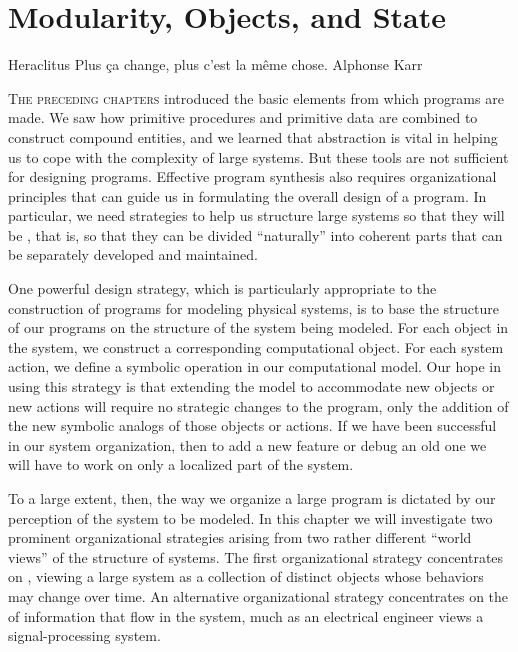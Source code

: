\chapter{Modularity, Objects, and State}
\label{Chapter 3}

%
  {Heraclitus}%
  {}{}%
  {%
    Plus \c{c}a change, plus c'est la m\^{e}me chose.
  }%
  {Alphonse Karr}%
  {}{}%


\noindent
\lettrine{T}{he preceding chapters} introduced the basic elements from which programs are
made.  We saw how primitive procedures and primitive data are combined to
construct compound entities, and we learned that abstraction is vital in
helping us to cope with the complexity of large systems.  But these tools are
not sufficient for designing programs.  Effective program synthesis also
requires organizational principles that can guide us in formulating the overall
design of a program.  In particular, we need strategies to help us structure
large systems so that they will be , that is, so that they can
be divided ``naturally'' into coherent parts that can be separately developed
and maintained.

One powerful design strategy, which is particularly appropriate to the
construction of programs for modeling physical systems, is to base the
structure of our programs on the structure of the system being modeled.  For
each object in the system, we construct a corresponding computational object.
For each system action, we define a symbolic operation in our computational
model.  Our hope in using this strategy is that extending the model to
accommodate new objects or new actions will require no strategic changes to the
program, only the addition of the new symbolic analogs of those objects or
actions.  If we have been successful in our system organization, then to add a
new feature or debug an old one we will have to work on only a localized part
of the system.

To a large extent, then, the way we organize a large program is dictated by our
perception of the system to be modeled.  In this chapter we will investigate
two prominent organizational strategies arising from two rather different
``world views'' of the structure of systems.  The first organizational strategy
concentrates on , viewing a large system as a collection of
distinct objects whose behaviors may change over time.  An alternative
organizational strategy concentrates on the  of information
that flow in the system, much as an electrical engineer views a
signal-processing system.

